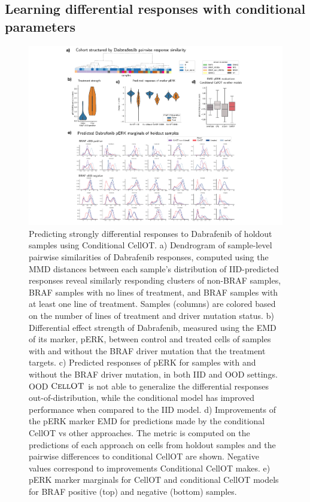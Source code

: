 \subsection{Learning differential responses with conditional parameters}

\begin{figure}[h]
  \begin{center}
    \includegraphics[width=\textwidth]{figures/cellot-cohort/condot.pdf}
  \end{center}
  \caption{
    Predicting strongly differential responses to Dabrafenib of holdout samples using Conditional CellOT.
    a) Dendrogram of sample-level pairwise similarities of Dabrafenib responses, computed using the MMD distances between each sample's distribution of IID-predicted responses reveal similarly responding clusters of non-BRAF samples, BRAF samples with no lines of treatment, and BRAF samples with at least one line of treatment.
    Samples (columns) are colored based on the number of lines of treatment and driver mutation status.
    b) Differential effect strength of Dabrafenib, measured using the EMD of its marker, pERK, between control and treated cells of samples with and without the BRAF driver mutation that the treatment targets.
    c) Predicted responses of pERK for samples with and without the BRAF driver mutation, in both IID and OOD settings.
    OOD $\textsc{CellOT}$ is not able to generalize the differential responses out-of-distribution, while the conditional model has improved performance when compared to the IID model.
    d) Improvements of the pERK marker EMD for predictions made by the conditional CellOT vs other approaches. The metric is computed on the predictions of each approach on cells from holdout samples and the pairwise differences to conditional CellOT are shown. Negative values correspond to improvements Conditional CellOT makes. 
    e) pERK marker marginals for CellOT and conditional CellOT models for BRAF positive (top) and negative (bottom) samples.
  }\label{fig:conditional-ot}
\end{figure}

